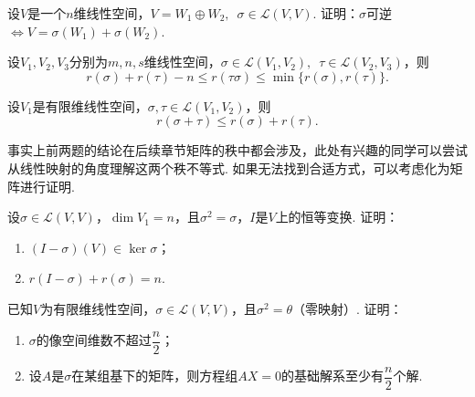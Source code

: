 \begin{exercise}
\begin{exgroup}
        \item 设$V$是一个$n$维线性空间，$V=W_1\oplus W_2,\enspace\sigma\in \mathcal{L}(V,V)$. 证明：$\sigma$可逆$\iff V=\sigma(W_1)+\sigma(W_2)$.

        \item 设$V_1,V_2,V_3$分别为$m,n,s$维线性空间，$\sigma\in \mathcal{L}(V_1,V_2),\enspace\tau\in \mathcal{L}(V_2,V_3)$，则
        \[r(\sigma)+r(\tau)-n \leqslant r(\tau\sigma) \leqslant \min\{r(\sigma),r(\tau)\}.\]

        \item 设$V_1$是有限维线性空间，$\sigma,\tau\in \mathcal{L}(V_1,V_2)$，则
        \[r(\sigma+\tau) \leqslant r(\sigma)+r(\tau).\]

        事实上前两题的结论在后续章节矩阵的秩中都会涉及，此处有兴趣的同学可以尝试从线性映射的角度理解这两个秩不等式. 如果无法找到合适方式，可以考虑化为矩阵进行证明.

        \item 设$\sigma\in \mathcal{L}(V,V)$，$\dim V_1=n$，且$\sigma^2=\sigma$，$I$是$V$上的恒等变换. 证明：
        \begin{enumerate}
            \item $(I-\sigma)(V) \in \ker\sigma$；

            \item $r(I-\sigma)+r(\sigma)=n$.
        \end{enumerate}

        \item 已知$V$为有限维线性空间，$\sigma\in \mathcal{L}(V,V)$，且$\sigma^2=\theta$（零映射）. 证明：
        \begin{enumerate}
            \item $\sigma$的像空间维数不超过$\dfrac{n}{2}$；

            \item 设$A$是$\sigma$在某组基下的矩阵，则方程组$AX=0$的基础解系至少有$\dfrac{n}{2}$个解.
        \end{enumerate}
    \end{exgroup}
\end{exercise}
